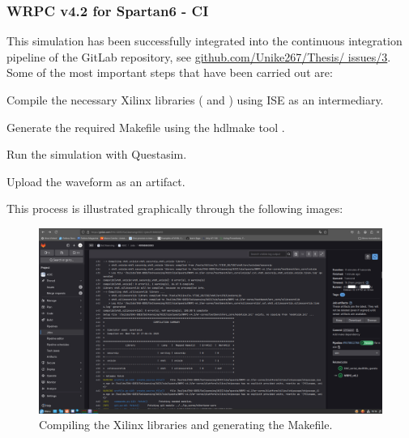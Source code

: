 \vspace{5mm}

\subsubsection{WRPC v4.2 for Spartan6 - CI}

\noindent This simulation has been successfully integrated into the continuous integration pipeline of the GitLab repository, see \href{https://github.com/Unike267/Thesis/issues/3}{github.com/Unike267/Thesis/ issues/3}.
Some of the most important steps that have been carried out are:

\begin{dig}
\item Compile the necessary Xilinx libraries ( and ) using ISE as an intermediary.
\item Generate the required Makefile using the hdlmake tool \cite{hdl-make:ohwr}.
\item Run the simulation with Questasim.
\item Upload the waveform as an artifact.
\end{dig}

\vspace{1mm}

\noindent This process is illustrated graphically through the following images:

\begin{figure}[H]
\centering
\includegraphics[width=14cm]{figures/wrpc_ci_1.png}
\caption{Compiling the Xilinx libraries and generating the Makefile.}
\label{fig:wrpc-ci-1}
\end{figure}

